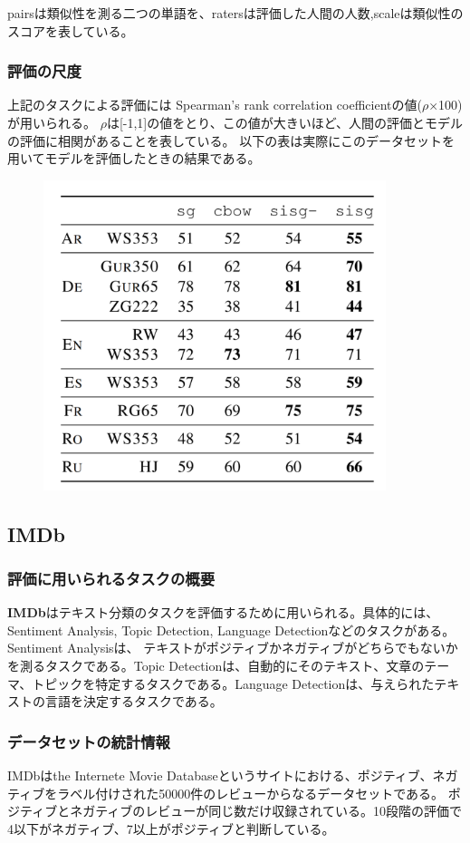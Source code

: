 \documentclass[a4j,11pt]{jarticle}
\begin{document}
pairsは類似性を測る二つの単語を、ratersは評価した人間の人数,scaleは類似性のスコアを表している。

\subsubsection*{評価の尺度}
上記のタスクによる評価には Spearman’s rank correlation coefficientの値($\rho$×100)が用いられる。
$\rho$は[-1,1]の値をとり、この値が大きいほど、人間の評価とモデルの評価に相関があることを表している。
以下の表\cite{fasttext}は実際にこのデータセットを用いてモデルを評価したときの結果である。

\begin{figure}[hbtp]
    \centering
    \includegraphics[width=10cm]{p3-2.png}
\end{figure}

\newpage
\subsection{IMDb}
\subsubsection*{評価に用いられるタスクの概要}
\textbf{IMDb}はテキスト分類のタスクを評価するために用いられる。具体的には、Sentiment Analysis, Topic Detection, Language Detectionなどのタスクがある。
Sentiment Analysisは、 テキストがポジティブかネガティブがどちらでもないかを測るタスクである。Topic Detectionは、自動的にそのテキスト、文章のテーマ、トピックを特定するタスクである。Language Detectionは、与えられたテキストの言語を決定するタスクである。

\subsubsection*{データセットの統計情報}
IMDbはthe Internete Movie Databaseというサイトにおける、ポジティブ、ネガティブをラベル付けされた50000件のレビューからなるデータセットである。
ポジティブとネガティブのレビューが同じ数だけ収録されている。10段階の評価で4以下がネガティブ、7以上がポジティブと判断している。
\end{document}
